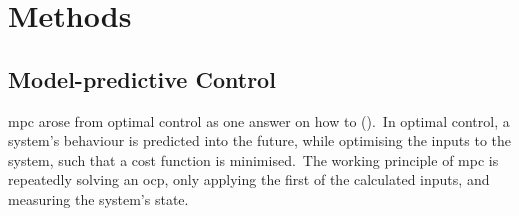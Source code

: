 \section{Methods}

\subsection{Model-predictive Control}
\ac{mpc} arose from optimal control as one answer on how to  (\cite{rawlings2017mpc}).\ 
In optimal control, a system's behaviour is predicted into the future, while optimising the inputs to the system, such that a cost function is minimised.\
The working principle of \ac{mpc} is repeatedly solving an \ac{ocp}, only applying the first of the calculated inputs, and measuring the system's state.\ 

